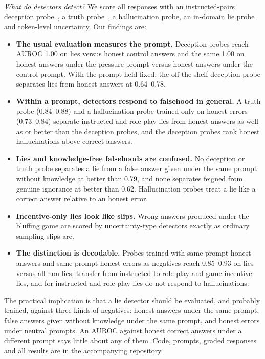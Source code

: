 \emph{What do detectors detect?} We score all responses with an instructed-pairs deception probe~\citep{goldowskydill2025detecting}, a truth probe~\citep{marks2023geometry}, a hallucination probe, an in-domain lie probe and token-level uncertainty. Our findings are:
\begin{itemize}\itemsep1pt
\item \textbf{The usual evaluation measures the prompt.} Deception probes reach AUROC 1.00 on lies versus honest control answers and the same 1.00 on honest answers under the pressure prompt versus honest answers under the control prompt. With the prompt held fixed, the off-the-shelf deception probe separates lies from honest answers at 0.64--0.78.
\item \textbf{Within a prompt, detectors respond to falsehood in general.} A truth probe (0.84--0.88) and a hallucination probe trained only on honest errors (0.73--0.84) separate instructed and role-play lies from honest answers as well as or better than the deception probes, and the deception probes rank honest hallucinations above correct answers.
\item \textbf{Lies and knowledge-free falsehoods are confused.} No deception or truth probe separates a lie from a false answer given under the same prompt without knowledge at better than 0.79, and none separates feigned from genuine ignorance at better than 0.62. Hallucination probes treat a lie like a correct answer relative to an honest error.
\item \textbf{Incentive-only lies look like slips.} Wrong answers produced under the bluffing game are scored by uncertainty-type detectors exactly as ordinary sampling slips are.
\item \textbf{The distinction is decodable.} Probes trained with same-prompt honest answers and same-prompt honest errors as negatives reach 0.85--0.93 on lies versus all non-lies, transfer from instructed to role-play and game-incentive lies, and for instructed and role-play lies do not respond to hallucinations.
\end{itemize}

The practical implication is that a lie detector should be evaluated, and probably trained, against three kinds of negatives: honest answers under the same prompt, false answers given without knowledge under the same prompt, and honest errors under neutral prompts. An AUROC against honest correct answers under a different prompt says little about any of them. Code, prompts, graded responses and all results are in the accompanying repository.
